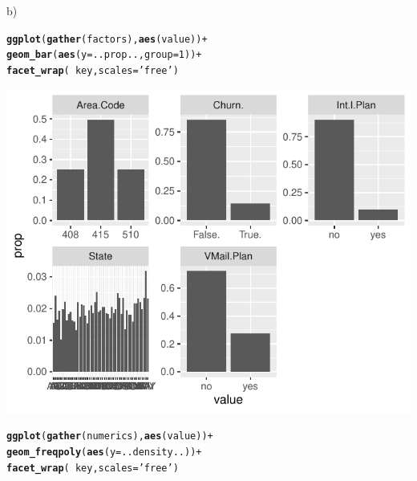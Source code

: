 \documentclass{article}\usepackage[]{graphicx}\usepackage[]{color}
\makeatletter
\def\maxwidth{ %
  \ifdim\Gin@nat@width>\linewidth
    \linewidth
  \else
    \Gin@nat@width
  \fi
}
\newcommand{\hlnum}[1]{\textcolor[rgb]{0.686,0.059,0.569}{#1}}%
\newcommand{\hlstr}[1]{\textcolor[rgb]{0.192,0.494,0.8}{#1}}%
\newcommand{\hlopt}[1]{\textcolor[rgb]{0,0,0}{#1}}%
\newcommand{\hlstd}[1]{\textcolor[rgb]{0.345,0.345,0.345}{#1}}%
\newcommand{\hlkwc}[1]{\textcolor[rgb]{0.333,0.667,0.333}{#1}}%
\newcommand{\hlkwd}[1]{\textcolor[rgb]{0.737,0.353,0.396}{\textbf{#1}}}%
\newenvironment{kframe}{%
 \def\at@end@of@kframe{}%
 \ifinner\ifhmode%
  \def\at@end@of@kframe{\end{minipage}}%
  \begin{minipage}{\columnwidth}%
 \fi\fi%
 \def\FrameCommand##1{\hskip\@totalleftmargin \hskip-\fboxsep
 \colorbox{shadecolor}{##1}\hskip-\fboxsep
     \hskip-\linewidth \hskip-\@totalleftmargin \hskip\columnwidth}%
 \MakeFramed {\advance\hsize-\width
   \@totalleftmargin\z@ \linewidth\hsize
   \@setminipage}}%
 {\par\unskip\endMakeFramed%
 \at@end@of@kframe}
\newenvironment{knitrout}{}{} %
\makeatother
\begin{document}
\begin{description}
\item{b)}

\begin{knitrout}
\color{fgcolor}\begin{kframe}
\begin{alltt}
\hlkwd{ggplot}\hlstd{(}\hlkwd{gather}\hlstd{(factors),} \hlkwd{aes}\hlstd{(value))} \hlopt{+}
  \hlkwd{geom_bar}\hlstd{(}\hlkwd{aes}\hlstd{(}\hlkwc{y}\hlstd{=..prop..,} \hlkwc{group}\hlstd{=}\hlnum{1}\hlstd{))} \hlopt{+}
  \hlkwd{facet_wrap}\hlstd{(}\hlopt{~}\hlstd{key,} \hlkwc{scales}\hlstd{=}\hlstr{'free'}\hlstd{)}
\end{alltt}
\end{kframe}

{\centering \includegraphics[width=\maxwidth]{figure/Overviews_plots-1} 

}


\begin{kframe}\begin{alltt}
\hlkwd{ggplot}\hlstd{(}\hlkwd{gather}\hlstd{(numerics),} \hlkwd{aes}\hlstd{(value))} \hlopt{+}
  \hlkwd{geom_freqpoly}\hlstd{(}\hlkwd{aes}\hlstd{(}\hlkwc{y}\hlstd{=..density..))} \hlopt{+}
  \hlkwd{facet_wrap}\hlstd{(}\hlopt{~}\hlstd{key,} \hlkwc{scales}\hlstd{=}\hlstr{'free'}\hlstd{)}
\end{alltt}
\end{kframe}


\end{knitrout}
\end{description}
\end{document}
